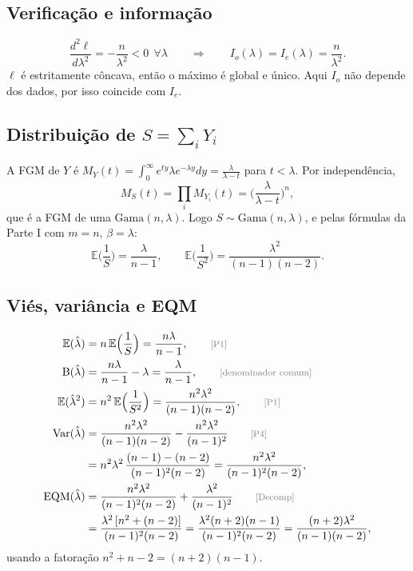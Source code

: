 \documentclass[11pt,a4paper]{article}
\newcommand{\E}{\mathbb{E}}
\newcommand{\Var}{\operatorname{Var}}
\newcommand{\EQM}{\operatorname{EQM}}
\newcommand{\B}{\operatorname{B}}
\newcommand{\just}[1]{\tag*{\footnotesize\textcolor{gray}{[#1]}}}
\theoremstyle{definition}
\theoremstyle{plain}
\begin{document}
\subsection*{Verificação e informação}
\[
\frac{d^2\ell}{d\lambda^2}=-\frac{n}{\lambda^2}<0\ \ \forall\lambda
\qquad\Longrightarrow\qquad
I_o(\lambda)=I_e(\lambda)=\frac{n}{\lambda^2}.
\]
$\ell$ é estritamente côncava, então o máximo é global e único. Aqui $I_o$ não depende dos dados, por isso coincide com $I_e$.

\subsection*{Distribuição de $S=\sum_iY_i$}
A FGM de $Y$ é $M_Y(t)=\int_0^\infty e^{ty}\lambda e^{-\lambda y}dy=\frac{\lambda}{\lambda-t}$ para $t<\lambda$. Por independência,
\[
M_S(t)=\prod_iM_{Y_i}(t)=\Big(\frac{\lambda}{\lambda-t}\Big)^n,
\]
que é a FGM de uma $\text{Gama}(n,\lambda)$. Logo $S\sim\text{Gama}(n,\lambda)$, e pelas fórmulas da Parte I com $m=n$, $\beta=\lambda$:
\[
\E\Big(\frac1S\Big)=\frac{\lambda}{n-1},\qquad\E\Big(\frac1{S^2}\Big)=\frac{\lambda^2}{(n-1)(n-2)}.
\]

\subsection*{Viés, variância e EQM}
\begin{align*}
\E(\hat\lambda)&=n\,\E\Big(\frac1S\Big)=\frac{n\lambda}{n-1}, \just{P1}\\
\B(\hat\lambda)&=\frac{n\lambda}{n-1}-\lambda=\frac{\lambda}{n-1}, \just{denominador comum}\\
\E(\hat\lambda^2)&=n^2\,\E\Big(\frac1{S^2}\Big)=\frac{n^2\lambda^2}{(n-1)(n-2)}, \just{P1}\\
\Var(\hat\lambda)&=\frac{n^2\lambda^2}{(n-1)(n-2)}-\frac{n^2\lambda^2}{(n-1)^2} \just{P4}\\
&=n^2\lambda^2\,\frac{(n-1)-(n-2)}{(n-1)^2(n-2)}=\frac{n^2\lambda^2}{(n-1)^2(n-2)},\\
\EQM(\hat\lambda)&=\frac{n^2\lambda^2}{(n-1)^2(n-2)}+\frac{\lambda^2}{(n-1)^2} \just{Decomp}\\
&=\frac{\lambda^2\,[n^2+(n-2)]}{(n-1)^2(n-2)}=\frac{\lambda^2(n+2)(n-1)}{(n-1)^2(n-2)}=\frac{(n+2)\lambda^2}{(n-1)(n-2)},
\end{align*}
usando a fatoração $n^2+n-2=(n+2)(n-1)$.
\end{document}
